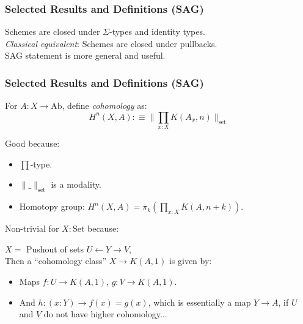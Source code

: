 \documentclass{beamer}
\begin{document}
\begin{frame}
  \frametitle{Selected Results and Definitions (SAG)}
  Schemes are closed under $\Sigma$-types and identity types. \\
  \pause
  \vspace{1cm}
  \emph{Classical equivalent}: Schemes are closed under pullbacks. \\
  \pause
  \vspace{1cm}
  SAG statement is more general and useful. \\
  \vspace{1cm}
\end{frame}

\begin{frame}
  \frametitle{Selected Results and Definitions (SAG)}
  \vspace{0.25cm}
  For $A : X \to \mathrm{Ab}$, define \emph{cohomology} as:
  \[ H^n(X, A) :\equiv \Big\| \prod_{x:X}K(A_x,n) \Big\|_{\mathrm{set}} \]
  
  \pause
  Good because:
  \begin{itemize}
  \item $\prod$-type.
  \item $\|\_\|_{\mathrm{set}}$ is a modality.
  \item Homotopy group: $H^n(X,A)=\pi_{k}(\prod_{x:X}K(A,n+k))$.
  \end{itemize}

  \pause
  Non-trivial for $X:\mathrm{Set}$ because:

  $X=$ Pushout of sets $U\leftarrow Y\to V$, \\
  Then a ``cohomology class'' $X\to K(A,1)$ is given by:
  \begin{itemize}
  \item Maps $f:U\to K(A,1)$, $g:V\to K(A,1)$.
  \item And $h:(x:Y)\to f(x)=g(x)$, which is essentially a map $Y\to A$,
    if $U$ and $V$ do not have higher cohomology...
  \end{itemize}
\end{frame}
\end{document}
